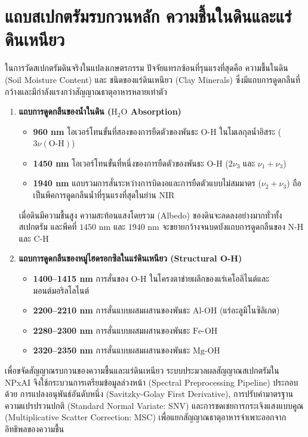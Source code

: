\documentclass[12pt,a4paper,oneside]{book}
\begin{document}
\section{แถบสเปกตรัมรบกวนหลัก ความชื้นในดินและแร่ดินเหนียว}
ในการวัดสเปกตรัมดินจริงในแปลงเกษตรกรรม ปัจจัยแทรกซ้อนที่รุนแรงที่สุดคือ ความชื้นในดิน (Soil Moisture Content) และ ชนิดของแร่ดินเหนียว (Clay Minerals) ซึ่งมีแถบการดูดกลืนที่กว้างและมีกำลังแรงกว่าสัญญาณธาตุอาหารหลายเท่าตัว

\begin{enumerate}
    \item \textbf{แถบการดูดกลืนของน้ำในดิน ($\text{H}_2\text{O}$ Absorption)}
    \begin{itemize}
        \item \textbf{960 nm} โอเวอร์โทนขั้นที่สองของการยืดตัวของพันธะ $\text{O-H}$ ในโมเลกุลน้ำอิสระ ($3\nu(\text{O-H})$)
        \item \textbf{1450 nm} โอเวอร์โทนขั้นที่หนึ่งของการยืดตัวของพันธะ $\text{O-H}$ ($2\nu_3$ และ $\nu_1 + \nu_3$)
        \item \textbf{1940 nm} แถบรวมการสั่นระหว่างการบิดงอและการยืดตัวแบบไม่สมมาตร ($\nu_2 + \nu_3$) ถือเป็นพีคการดูดกลืนน้ำที่รุนแรงที่สุดในย่าน NIR
    \end{itemize}
    เมื่อดินมีความชื้นสูง ความสะท้อนแสงโดยรวม (Albedo) ของดินจะลดลงอย่างมากทั่วทั้งสเปกตรัม และพีคที่ $1450\text{ nm}$ และ $1940\text{ nm}$ จะขยายกว้างจนบดบังแถบการดูดกลืนของ $\text{N-H}$ และ $\text{C-H}$
    
    \item \textbf{แถบการดูดกลืนของหมู่ไฮดรอกซิลในแร่ดินเหนียว (Structural O-H)}
    \begin{itemize}
        \item \textbf{1400--1415 nm} การสั่นของ $\text{O-H}$ ในโครงตาข่ายผลึกของแร่เคโอลิไนต์และมอนต์มอริลโลไนต์
        \item \textbf{2200--2210 nm} การสั่นแบบผสมผสานของพันธะ $\text{Al-OH}$ (แร่อะลูมิโนซิลิเกต)
        \item \textbf{2280--2300 nm} การสั่นแบบผสมผสานของพันธะ $\text{Fe-OH}$
        \item \textbf{2320--2350 nm} การสั่นแบบผสมผสานของพันธะ $\text{Mg-OH}$
    \end{itemize}
\end{enumerate}

เพื่อขจัดสัญญาณรบกวนของความชื้นและแร่ดินเหนียว ระบบประมวลผลสัญญาณสเปกตรัมใน NPxAI จึงใช้กระบวนการเตรียมข้อมูลล่วงหน้า (Spectral Preprocessing Pipeline) ประกอบด้วย การแปลงอนุพันธ์อันดับหนึ่ง (Savitzky-Golay First Derivative), การปรับค่ามาตรฐานความแปรปรวนปกติ (Standard Normal Variate: SNV) และการชดเชยการกระเจิงแสงแบบคูณ (Multiplicative Scatter Correction: MSC) เพื่อแยกสัญญาณธาตุอาหารจำเพาะออกจากอิทธิพลของความชื้น
\end{document}
